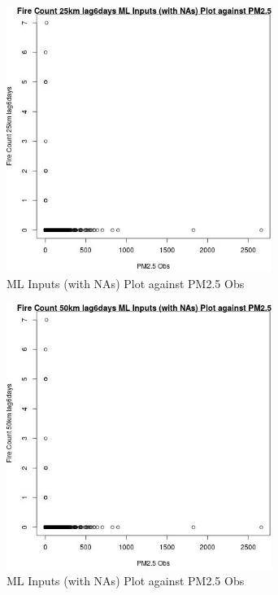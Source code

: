 \begin{figure} 
\centering  
\includegraphics[width=0.77\textwidth]{Code_Outputs/Report_ML_input_PM25_Step4_part_e_de_duplicated_aves_compiled_2019-05-20wNAs_Fire_Count_25km_lag6daysvPM25_Obs.jpg} 
\caption{\label{fig:Report_ML_input_PM25_Step4_part_e_de_duplicated_aves_compiled_2019-05-20wNAsFire_Count_25km_lag6daysvPM25_Obs}ML Inputs (with NAs) Plot against PM2.5 Obs} 
\end{figure} 
 

\begin{figure} 
\centering  
\includegraphics[width=0.77\textwidth]{Code_Outputs/Report_ML_input_PM25_Step4_part_e_de_duplicated_aves_compiled_2019-05-20wNAs_Fire_Count_50km_lag6daysvPM25_Obs.jpg} 
\caption{\label{fig:Report_ML_input_PM25_Step4_part_e_de_duplicated_aves_compiled_2019-05-20wNAsFire_Count_50km_lag6daysvPM25_Obs}ML Inputs (with NAs) Plot against PM2.5 Obs} 
\end{figure} 
 

